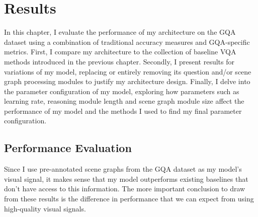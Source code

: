 \chapter{Results}
\label{chapter:results}

In this chapter, I evaluate the performance of my architecture on the GQA dataset using a combination of traditional accuracy measures and GQA-specific metrics. First, I compare my architecture to the collection of baseline VQA methods introduced in the previous chapter. Secondly, I present results for variations of my model, replacing or entirely removing its question and/or scene graph processing modules to justify my architecture design. Finally, I delve into the parameter configuration of my model, exploring how parameters such as learning rate, reasoning module length and scene graph module size affect the performance of my model and the methods I used to find my final parameter configuration.

\section{Performance Evaluation}
\label{section:performance_evaluation}

Since I use pre-annotated scene graphs from the GQA dataset as my model's visual signal, it makes sense that my model outperforms existing baselines that don't have access to this information. The more important conclusion to draw from these results is the difference in performance that we can expect from using high-quality visual signals.

